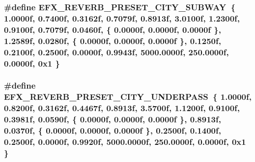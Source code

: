 \subsubsection[{\texorpdfstring{E\+F\+X\+\_\+\+R\+E\+V\+E\+R\+B\+\_\+\+P\+R\+E\+S\+E\+T\+\_\+\+C\+I\+T\+Y\+\_\+\+S\+U\+B\+W\+AY}{EFX_REVERB_PRESET_CITY_SUBWAY}}]{\setlength{\rightskip}{0pt plus 5cm}\#define E\+F\+X\+\_\+\+R\+E\+V\+E\+R\+B\+\_\+\+P\+R\+E\+S\+E\+T\+\_\+\+C\+I\+T\+Y\+\_\+\+S\+U\+B\+W\+AY~\{ 1.\+0000f, 0.\+7400f, 0.\+3162f, 0.\+7079f, 0.\+8913f, 3.\+0100f, 1.\+2300f, 0.\+9100f, 0.\+7079f, 0.\+0460f, \{ 0.\+0000f, 0.\+0000f, 0.\+0000f \}, 1.\+2589f, 0.\+0280f, \{ 0.\+0000f, 0.\+0000f, 0.\+0000f \}, 0.\+1250f, 0.\+2100f, 0.\+2500f, 0.\+0000f, 0.\+9943f, 5000.\+0000f, 250.\+0000f, 0.\+0000f, 0x1 \}}\hypertarget{efx-presets_8h_ad8fff58ad71c8bdac17504c3f8417ed1}{}\label{efx-presets_8h_ad8fff58ad71c8bdac17504c3f8417ed1}
\subsubsection[{\texorpdfstring{E\+F\+X\+\_\+\+R\+E\+V\+E\+R\+B\+\_\+\+P\+R\+E\+S\+E\+T\+\_\+\+C\+I\+T\+Y\+\_\+\+U\+N\+D\+E\+R\+P\+A\+SS}{EFX_REVERB_PRESET_CITY_UNDERPASS}}]{\setlength{\rightskip}{0pt plus 5cm}\#define E\+F\+X\+\_\+\+R\+E\+V\+E\+R\+B\+\_\+\+P\+R\+E\+S\+E\+T\+\_\+\+C\+I\+T\+Y\+\_\+\+U\+N\+D\+E\+R\+P\+A\+SS~\{ 1.\+0000f, 0.\+8200f, 0.\+3162f, 0.\+4467f, 0.\+8913f, 3.\+5700f, 1.\+1200f, 0.\+9100f, 0.\+3981f, 0.\+0590f, \{ 0.\+0000f, 0.\+0000f, 0.\+0000f \}, 0.\+8913f, 0.\+0370f, \{ 0.\+0000f, 0.\+0000f, 0.\+0000f \}, 0.\+2500f, 0.\+1400f, 0.\+2500f, 0.\+0000f, 0.\+9920f, 5000.\+0000f, 250.\+0000f, 0.\+0000f, 0x1 \}}\hypertarget{efx-presets_8h_a9f13c8083a74def4b4b47e5c9b59dbed}{}\label{efx-presets_8h_a9f13c8083a74def4b4b47e5c9b59dbed}
